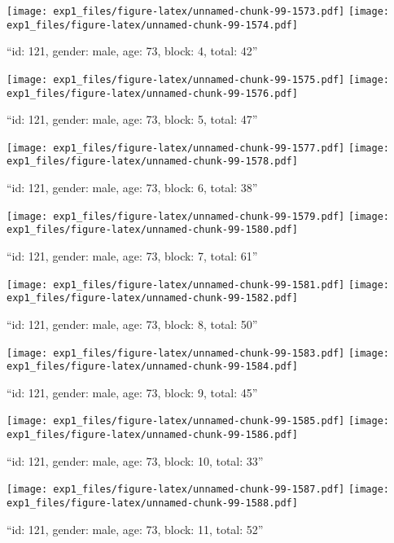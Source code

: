 \documentclass[,]{article}
\begin{document}
\texttt{[image: exp1\_files/figure-latex/unnamed-chunk-99-1573.pdf]}
\texttt{[image: exp1\_files/figure-latex/unnamed-chunk-99-1574.pdf]}

\newpage
[1] 

``id: 121, gender: male, age: 73, block: 4, total: 42''

\texttt{[image: exp1\_files/figure-latex/unnamed-chunk-99-1575.pdf]}
\texttt{[image: exp1\_files/figure-latex/unnamed-chunk-99-1576.pdf]}

\newpage
[1] 

``id: 121, gender: male, age: 73, block: 5, total: 47''

\texttt{[image: exp1\_files/figure-latex/unnamed-chunk-99-1577.pdf]}
\texttt{[image: exp1\_files/figure-latex/unnamed-chunk-99-1578.pdf]}

\newpage
[1] 

``id: 121, gender: male, age: 73, block: 6, total: 38''

\texttt{[image: exp1\_files/figure-latex/unnamed-chunk-99-1579.pdf]}
\texttt{[image: exp1\_files/figure-latex/unnamed-chunk-99-1580.pdf]}

\newpage
[1] 

``id: 121, gender: male, age: 73, block: 7, total: 61''

\texttt{[image: exp1\_files/figure-latex/unnamed-chunk-99-1581.pdf]}
\texttt{[image: exp1\_files/figure-latex/unnamed-chunk-99-1582.pdf]}

\newpage
[1] 

``id: 121, gender: male, age: 73, block: 8, total: 50''

\texttt{[image: exp1\_files/figure-latex/unnamed-chunk-99-1583.pdf]}
\texttt{[image: exp1\_files/figure-latex/unnamed-chunk-99-1584.pdf]}

\newpage
[1] 

``id: 121, gender: male, age: 73, block: 9, total: 45''

\texttt{[image: exp1\_files/figure-latex/unnamed-chunk-99-1585.pdf]}
\texttt{[image: exp1\_files/figure-latex/unnamed-chunk-99-1586.pdf]}

\newpage
[1] 

``id: 121, gender: male, age: 73, block: 10, total: 33''

\texttt{[image: exp1\_files/figure-latex/unnamed-chunk-99-1587.pdf]}
\texttt{[image: exp1\_files/figure-latex/unnamed-chunk-99-1588.pdf]}

\newpage
[1] 

``id: 121, gender: male, age: 73, block: 11, total: 52''
\end{document}

